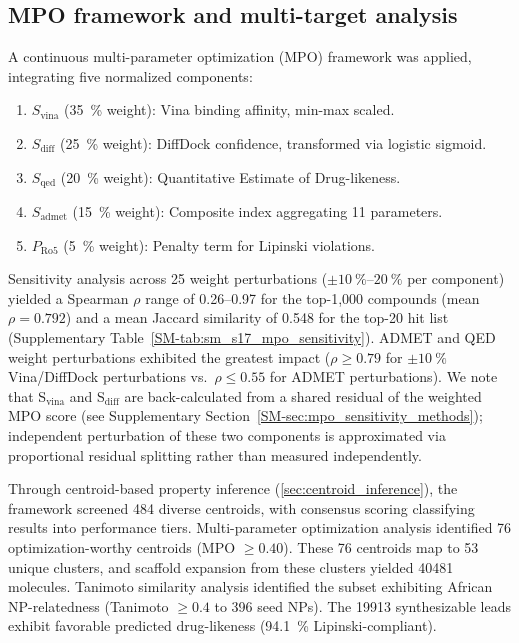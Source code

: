 \documentclass[journal=jcisd8,manuscript=article]{achemso}
\begin{document}
\subsection{MPO framework and multi-target analysis}
\label{sec:mpo-tiering}

A continuous multi-parameter optimization (MPO) framework was applied, integrating five normalized components:
\begin{enumerate}
    \item $S_{\text{vina}}$ (\qty{35}{\percent} weight): Vina binding affinity, min-max scaled.
    \item $S_{\text{diff}}$ (\qty{25}{\percent} weight): DiffDock confidence, transformed via logistic sigmoid.
    \item $S_{\text{qed}}$ (\qty{20}{\percent} weight): Quantitative Estimate of Drug-likeness.
    \item $S_{\text{admet}}$ (\qty{15}{\percent} weight): Composite index aggregating \num{11} parameters.
    \item $P_{\text{Ro5}}$ (\qty{5}{\percent} weight): Penalty term for Lipinski violations.
\end{enumerate}
Sensitivity analysis across \num{25} weight perturbations ($\pm \qtyrange{10}{20}{\percent}$ per component) yielded a Spearman $\rho$ range of \numrange{0.26}{0.97} for the top-1,000 compounds (mean $\rho = \num{0.792}$) and a mean Jaccard similarity of \num{0.548} for the top-20 hit list (Supplementary Table~\ref{SM-tab:sm_s17_mpo_sensitivity}). ADMET and QED weight perturbations exhibited the greatest impact ($\rho \geq \num{0.79}$ for $\pm\qty{10}{\percent}$ Vina/DiffDock perturbations vs.\ $\rho \leq \num{0.55}$ for ADMET perturbations). We note that S$_{\text{vina}}$ and S$_{\text{diff}}$ are back-calculated from a shared residual of the weighted MPO score (see Supplementary Section~\ref*{SM-sec:mpo_sensitivity_methods}); independent perturbation of these two components is approximated via proportional residual splitting rather than measured independently.

Through centroid-based property inference (\cref{sec:centroid_inference}), the framework screened \num{484} diverse centroids, with consensus scoring classifying results into performance tiers. Multi-parameter optimization analysis identified \num{76} optimization-worthy centroids (MPO $\geq \num{0.40}$). These \num{76} centroids map to \num{53} unique clusters, and scaffold expansion from these clusters yielded \num{40481} molecules. Tanimoto similarity analysis identified the subset exhibiting African NP-relatedness (Tanimoto $\geq \num{0.4}$ to \num{396} seed NPs). The \num{19913} synthesizable leads exhibit favorable predicted drug-likeness (\qty{94.1}{\percent} Lipinski-compliant).
\end{document}
